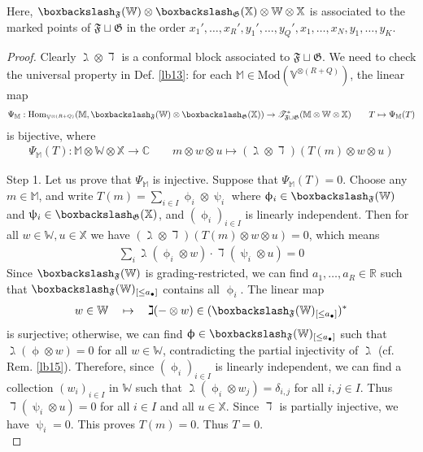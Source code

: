 \documentclass[11pt,b5paper,notitlepage]{article}
\theoremstyle{definition}
\theoremstyle{plain}
\newcommand{\fk}{\mathfrak}
\newcommand{\Hom}{\mathrm{Hom}}
\newcommand{\blt}{\bullet}
\newcommand{\Vbb}{\mathbb V}
\newcommand{\Xbb}{\mathbb X}
\newcommand{\Wbb}{\mathbb W}
\newcommand{\Mbb}{\mathbb M}
\newcommand{\Cbb}{\mathbb C}
\newcommand{\Rbb}{\mathbb R}
\newcommand{\<}{\left\langle}
\renewcommand{\>}{\right\rangle}
\newcommand{\ST}{\mathscr{T}}
\newcommand{\bbs}{\boxbackslash}
\newcommand{\Mod}{\mathrm{Mod}}
\newcommand{\ff}{\mathfrak{F}}
\newcommand{\fg}{\mathfrak{G}}
\numberwithin{equation}{section}
\begin{document}
Here, $\bbs_{\fk F}(\Wbb)\otimes \bbs_{\fk G}(\Xbb)\otimes\Wbb\otimes \Xbb$ is associated to the marked points of $\ff\sqcup\fg$ in the order $x_1',\dots,x_R',y_1',\dots,y_Q',x_1,\dots,x_N,y_1,\dots,y_K$.



\begin{proof}
Clearly $\gimel\otimes\daleth$ is a conformal block associated to $\ff\sqcup\fg$. We need to check the universal property in Def. \ref{lb13}: for each $\Mbb\in\Mod(\Vbb^{\otimes(R+Q)})$, the linear map
\begin{align*}
\Psi_\Mbb:\Hom_{\Vbb^{\otimes (R+Q)}}(\Mbb,\bbs_{\fk F}(\Wbb)\otimes \bbs_{\fk G}(\Xbb))\rightarrow\ST^*_{\ff\sqcup\fg}(\Mbb\otimes \Wbb\otimes\Xbb)\qquad T\mapsto \Psi_\Mbb(T)
\end{align*}
is bijective, where
\begin{align*}
\Psi_\Mbb(T):\Mbb\otimes\Wbb\otimes\Xbb\rightarrow\Cbb\qquad m\otimes w\otimes u\mapsto (\gimel\otimes\daleth)(T(m)\otimes w\otimes u)
\end{align*}

Step 1. Let us prove that $\Psi_\Mbb$ is injective. Suppose that $\Psi_\Mbb(T)=0$. Choose any $m\in\Mbb$, and write $T(m)=\sum_{i\in I} \upphi_i\otimes\uppsi_i$ where $\upphi_i\in\bbs_\ff(\Wbb)$ and $\uppsi_i\in\bbs_\fg(\Xbb)$, and $(\upphi_i)_{i\in I}$ is linearly independent. Then for all $w\in\Wbb,u\in\Xbb$ we have $(\gimel\otimes\daleth)(T(m)\otimes w\otimes u)=0$, which means
\begin{align*}
\sum_i \gimel (\upphi_i\otimes w)\cdot \daleth(\uppsi_i\otimes u)=0
\end{align*}
Since $\bbs_\ff(\Wbb)$ is grading-restricted, we can find $a_1,\dots,a_R\in\Rbb$ such that $\bbs_\ff(\Wbb)_{[\leq a_\blt]}$ contains all $\upphi_i$.  The linear map
\begin{align*}
w\in\Wbb\quad\mapsto \quad \gimel(-\otimes w)\in(\bbs_\ff(\Wbb)_{[\leq a_\blt]})^*
\end{align*}
is surjective; otherwise, we can find $\upphi\in \bbs_\ff(\Wbb)_{[\leq a_\blt]}$ such that $\gimel(\upphi\otimes w)=0$ for all $w\in\Wbb$, contradicting the partial injectivity of $\gimel$ (cf. Rem. \ref{lb15}). Therefore, since $(\upphi_i)_{i\in I}$ is linearly independent, we can find a collection $(w_i)_{i\in I}$ in $\Wbb$ such that $\gimel(\upphi_i\otimes w_j)=\delta_{i,j}$ for all $i,j\in I$. Thus $\daleth(\uppsi_i\otimes u)=0$ for all $i\in I$ and all $u\in \Xbb$. Since $\daleth$ is partially injective, we have $\uppsi_i=0$. This proves $T(m)=0$. Thus $T=0$.\\[-1ex]



\end{proof}
\end{document}
